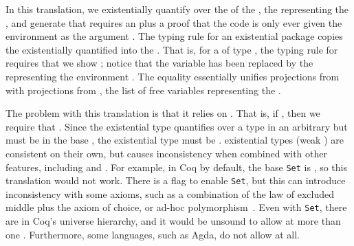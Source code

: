 In this translation, we existentially quantify over the  of the
 \im{\talpha}, the \emph{} representing the
 \im{\tn}, and generate  that requires an
 \im{\tnpr} plus a proof that the code is only ever given the
environment \im{\tn} as the argument \im{\tnpr}.
The typing rule for an existential package copies the existentially quantified
 into the .
That is, for a  \im{\tnpackoe{\tApr,\tv,\te}} of type
\im{\texistty{\talpha}{\tU}{\texistty{\tn}{\talpha}{\tcodety{\tnpr{\,:\,}\talpha,
        \ty{\,:\,}\tnpr = \tn,\tx{\,:\,}\cctrans{\sA}}{\cctrans{\sB}}}}}, the typing rule for
 requires that we show \im{\te : \tcodety{\tnpr{\,:\,}\tApr,
        \ty{\,:\,}\tnpr = \tv,\tx{\,:\,}\cctrans{\sA}}{\cctrans{\sB}}}; notice that the variable \im{\tn}
has been replaced by the  representing the environment \im{\tv}.
The equality \im{\tnpr = \tv} essentially unifies projections from \im{\tnpr}
with projections from \im{\tv}, the list of free variables representing the
.

The problem with this translation is that it relies on
\emph{}.
That is, if \im{(\spity{\sx}{\sA}{\sB}) : \spropty}, then we require that
\im{\cctrans{(\spity{\sx}{\sA}{\sB})} : \tpropty}.
Since the existential type quantifies over a type in an arbitrary
 \im{\tU} but must be in the base  \im{\tpropty},
the existential type must be .
 existential types (weak ) are
consistent on their own, but  causes inconsistency when
combined with other features, including  and
.
For example, in Coq by default, the base  
\texttt{Set} is , so this translation would not work.
There is a flag to enable  \texttt{Set}, but this can
introduce inconsistency with some axioms, such as a combination of the law of
excluded middle plus the axiom of choice, or ad-hoc
polymorphism~\cite{boulier2017}.
Even with  \texttt{Set}, there are 
 in Coq's universe hierarchy, and it would be unsound to
allow  at more than one .
Furthermore, some  languages, such as Agda, do not allow
 at all.

